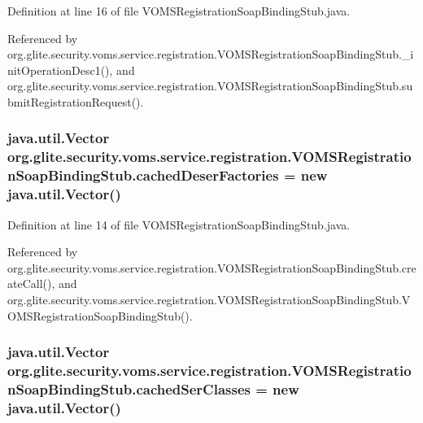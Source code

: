 Definition at line 16 of file VOMSRegistrationSoapBindingStub.java.



Referenced by org.glite.security.voms.service.registration.VOMSRegistrationSoapBindingStub.\_\-initOperationDesc1(), and org.glite.security.voms.service.registration.VOMSRegistrationSoapBindingStub.submitRegistrationRequest().

\hypertarget{classorg_1_1glite_1_1security_1_1voms_1_1service_1_1registration_1_1VOMSRegistrationSoapBindingStub_aca02be7dafd84f17d14e36a7ad1ecda2}{
\subsubsection[{cachedDeserFactories}]{\setlength{\rightskip}{0pt plus 5cm}java.util.Vector {\bf org.glite.security.voms.service.registration.VOMSRegistrationSoapBindingStub.cachedDeserFactories} = new java.util.Vector()}}
\label{classorg_1_1glite_1_1security_1_1voms_1_1service_1_1registration_1_1VOMSRegistrationSoapBindingStub_aca02be7dafd84f17d14e36a7ad1ecda2}


Definition at line 14 of file VOMSRegistrationSoapBindingStub.java.



Referenced by org.glite.security.voms.service.registration.VOMSRegistrationSoapBindingStub.createCall(), and org.glite.security.voms.service.registration.VOMSRegistrationSoapBindingStub.VOMSRegistrationSoapBindingStub().

\hypertarget{classorg_1_1glite_1_1security_1_1voms_1_1service_1_1registration_1_1VOMSRegistrationSoapBindingStub_aa0c5282023851e965b10603c10b5e264}{
\subsubsection[{cachedSerClasses}]{\setlength{\rightskip}{0pt plus 5cm}java.util.Vector {\bf org.glite.security.voms.service.registration.VOMSRegistrationSoapBindingStub.cachedSerClasses} = new java.util.Vector()}}
\label{classorg_1_1glite_1_1security_1_1voms_1_1service_1_1registration_1_1VOMSRegistrationSoapBindingStub_aa0c5282023851e965b10603c10b5e264}


